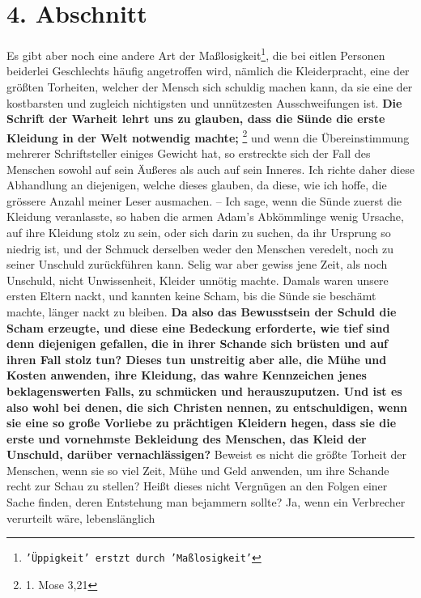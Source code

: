\section{4. Abschnitt} \label{kap14_ab4}

Es gibt aber noch eine andere Art der Maßlosigkeit\footnote{\texttt{'Üppigkeit' erstzt 
durch 'Maßlosigkeit'}}, die bei eitlen Personen beiderlei
Geschlechts häufig angetroffen wird, nämlich die Kleiderpracht, eine der
größten Torheiten, welcher der Mensch sich schuldig machen kann, da sie eine
der kostbarsten und zugleich nichtigsten und unnützesten Ausschweifungen ist. \textbf{Die
Schrift der Warheit lehrt uns zu glauben, dass die Sünde die erste Kleidung in der
Welt notwendig machte;}
\footnote{1. Mose 3,21}
und wenn die Übereinstimmung
mehrerer Schriftsteller einiges Gewicht hat, so erstreckte sich der Fall des
Menschen sowohl auf sein Äußeres als auch auf sein Inneres. Ich richte daher diese
Abhandlung an diejenigen, welche dieses glauben, da diese, wie ich hoffe, die
grössere Anzahl meiner Leser ausmachen. -- Ich sage, wenn die Sünde zuerst die
Kleidung veranlasste, so haben die armen Adam’s Abkömmlinge wenig Ursache, auf
ihre Kleidung stolz zu sein, oder sich darin zu suchen, da ihr Ursprung so
niedrig ist, und der Schmuck derselben weder den Menschen veredelt, noch zu
seiner Unschuld zurückführen kann. Selig war aber gewiss jene Zeit, als noch
Unschuld, nicht Unwissenheit, Kleider unnötig machte. Damals waren unsere ersten
Eltern nackt, und kannten keine Scham, bis die Sünde sie beschämt machte,
länger nackt zu bleiben. \label{ref:14_04_wahre_nachfolger_kleidung}
\textbf{Da also das Bewusstsein der Schuld die Scham erzeugte,
und diese eine Bedeckung erforderte, wie tief sind denn diejenigen gefallen, die
in ihrer Schande sich brüsten und auf ihren Fall stolz tun? Dieses tun
unstreitig aber alle, die Mühe und Kosten anwenden, ihre Kleidung, das wahre
Kennzeichen jenes beklagenswerten Falls, zu schmücken und herauszuputzen. Und
ist es also wohl bei denen, die sich Christen nennen, zu entschuldigen, wenn sie
eine so große Vorliebe zu prächtigen Kleidern hegen, dass sie die erste und
vornehmste Bekleidung des Menschen, das Kleid der Unschuld, darüber
vernachlässigen?} Beweist es nicht die größte Torheit der Menschen, wenn sie so
viel Zeit, Mühe und Geld anwenden, um ihre Schande recht zur Schau zu stellen?
Heißt dieses nicht Vergnügen an den Folgen einer Sache finden, deren Entstehung
man bejammern sollte? Ja, wenn ein Verbrecher verurteilt wäre, lebenslänglich
